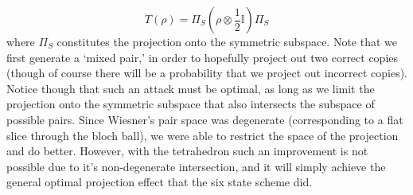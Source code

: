 \documentclass[12pt]{article}
\begin{document}
\begin{enumerate}
$$ T(\rho) = \Pi_S(\rho \otimes \frac{1}{2}\mathbb{I})\Pi_S $$
where $\Pi_S$ constitutes the projection onto the symmetric subspace. Note that we first generate a `mixed pair,' in order to hopefully project out two correct copies (though of course there will be a probability that we project out incorrect copies). Notice though that such an attack must be optimal, as long as we limit the projection onto the symmetric subspace that also intersects the subspace of possible pairs. Since Wiesner's pair space was degenerate (corresponding to a flat slice through the bloch ball), we were able to restrict the space of the projection and do better. However, with the tetrahedron such an improvement is not possible due to it's non-degenerate intersection, and it will simply achieve the general optimal projection effect that the six state scheme did.

\end{enumerate}
\end{document}
